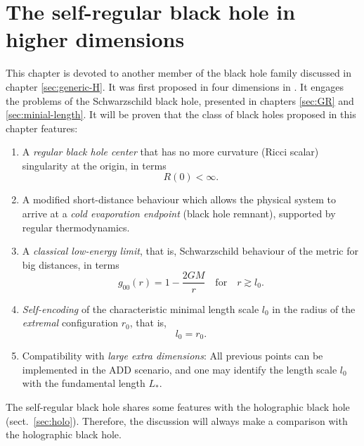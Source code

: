 \documentclass[12pt,a4paper]{report}
\numberwithin{equation}{chapter}
\begin{document}
\chapter{The self-regular black hole in higher dimensions}\label{sec:self-regular}
This chapter is devoted to another member of the black hole family discussed in chapter \ref{sec:generic-H}. It was first proposed in four dimensions in \cite{NS2012}. It engages the problems of the Schwarzschild black hole, presented in chapters \ref{sec:GR} and \ref{sec:minial-length}. It will be proven that the class of black holes proposed in this chapter features:
\begin{enumerate}
\item A \emph{regular black hole center} that has no more curvature (Ricci scalar) singularity at the origin, in terms
\begin{equation}
R(0) < \infty.
\end{equation}
%
\item A modified short-distance behaviour which allows the physical system to arrive at a \emph{cold evaporation endpoint} (black hole remnant), supported by regular thermodynamics.
%
\item A \emph{classical low-energy limit}, that is, Schwarzschild behaviour of the metric for big distances, in terms
\begin{equation}
g_{00}(r) = 1 - \frac{2GM}{r} \quad \text{for} \quad r \gtrsim l_0.
\end{equation}
%
\item \emph{Self-encoding} of the characteristic minimal length scale $l_0$ in the radius of the \emph{extremal} configuration $r_0$, that is,
\begin{equation}\label{eq:self-encoding-principle}
l_0 = r_0.
\end{equation}
%
\item Compatibility with \emph{large extra dimensions}: All previous points can be implemented in the ADD scenario, and one may identify the length scale $l_0$ with the fundamental length $L_*$.
\end{enumerate}

The self-regular black hole shares some features with the holographic black hole (sect.~\ref{sec:holo}). Therefore, the discussion will always make a comparison with the holographic black hole.
\end{document}
